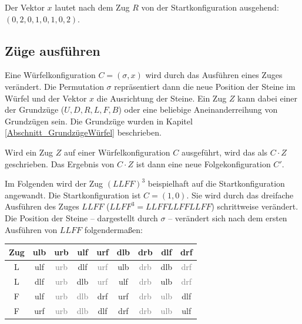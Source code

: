 \documentclass[12pt,a4paper, usenames, dvipsnames]{article}
\theoremstyle{mystyle}
\theoremstyle{definition}
\begin{document}
Der Vektor $x$ lautet nach dem Zug $R$ von der Startkonfiguration ausgehend: $(0, 2, 0, 1, 0, 1, 0, 2)$. 

%
%
%
%
%
%
%
%
%
%
\subsection{Züge ausführen}

\label{Abschnitt_ZuegeAusfuehren}

Eine Würfelkonfiguration $C=(\sigma, x)$ wird durch das Ausführen eines Zuges verändert.
Die Permutation $\sigma$ repräsentiert dann die neue Position der Steine im Würfel und der Vektor $x$ die Ausrichtung der Steine. Ein Zug $Z$ kann dabei einer der Grundzüge ($U,D,R,L,F,B$) oder eine beliebige Aneinanderreihung von Grundzügen sein. Die Grundzüge wurden in Kapitel \ref{Abschnitt_GrundzügeWürfel} beschrieben.

Wird ein Zug $Z$ auf einer Würfelkonfiguration $C$ ausgeführt, wird das als $C \cdot Z$ geschrieben. Das Ergebnis von $C \cdot Z$ ist dann eine neue Folgekonfiguration $C'$.

Im Folgenden wird der Zug $(LLFF)^3$ beispielhaft auf die Startkonfiguration angewandt. Die Startkonfiguration ist $C=(1,0)$. Sie wird durch das dreifache Ausführen des Zuges $LLFF$ ($LLFF^3 = LLFFLLFFLLFF$) schrittweise verändert.
Die Position der Steine -- dargestellt durch $\sigma$ -- verändert sich nach dem ersten Ausführen von $LLFF$ folgendermaßen:

\begin{center}
\begin{tabular}{ccccccccc}
\toprule
\textbf{Zug} & \textbf{ulb} & \textbf{urb} & \textbf{ulf} & \textbf{urf} & \textbf{dlb} & \textbf{drb} & \textbf{dlf} & \textbf{drf} \\
\midrule

L & ulf & \textcolor{gray}{urb} & dlf & \textcolor{gray}{urf} & ulb & \textcolor{gray}{drb} & dlb & \textcolor{gray}{drf} \\

L & dlf & \textcolor{gray}{urb} & dlb & \textcolor{gray}{urf} & ulf & \textcolor{gray}{drb} & ulb & \textcolor{gray}{drf} \\

F & ulf & \textcolor{gray}{urb} & \textcolor{gray}{dlb} & drf & urf & \textcolor{gray}{drb} & \textcolor{gray}{ulb} & dlf \\

F & urf & \textcolor{gray}{urb} & \textcolor{gray}{dlb} & dlf & drf & \textcolor{gray}{drb} & \textcolor{gray}{ulb} & ulf \\
\bottomrule
\end{tabular}
\end{center}
\end{document}
